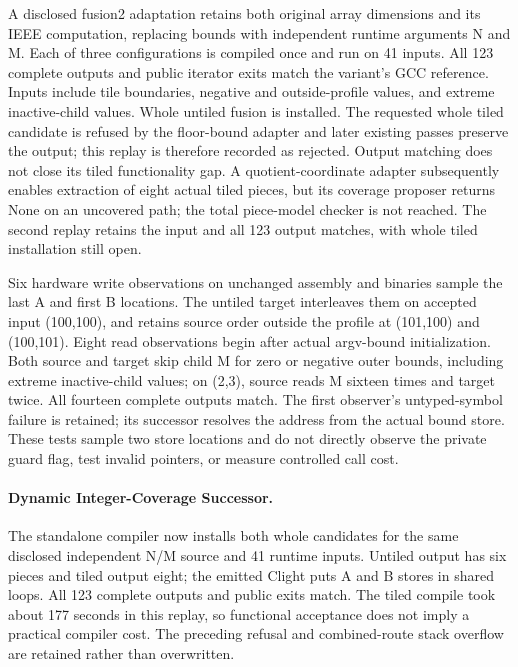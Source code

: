 A disclosed fusion2 adaptation retains both original array dimensions and its
IEEE computation, replacing bounds with independent runtime arguments N and M.
Each of three configurations is compiled once and run on 41 inputs. All 123
complete outputs and public iterator exits match the variant's GCC reference.
Inputs include tile boundaries, negative and outside-profile values, and extreme
inactive-child values. Whole untiled fusion is installed. The requested whole
tiled candidate is refused by the floor-bound adapter and later existing passes
preserve the output; this replay is therefore recorded as rejected. Output
matching does not close its tiled functionality gap. A quotient-coordinate
adapter subsequently enables extraction of eight actual tiled pieces, but its
coverage proposer returns None on an uncovered path; the total piece-model
checker is not reached. The second replay retains the input and all 123 output
matches, with whole tiled installation still open.

Six hardware write observations on unchanged assembly and binaries sample the
last A and first B locations. The untiled target interleaves them on accepted
input (100,100), and retains source order outside the profile at (101,100) and
(100,101). Eight read observations begin after actual argv-bound initialization.
Both source and target skip child M for zero or negative outer bounds, including
extreme inactive-child values; on (2,3), source reads M sixteen times and target
twice. All fourteen complete outputs match. The first observer's untyped-symbol
failure is retained; its successor resolves the address from the actual bound
store. These tests sample two store locations and do not directly observe the
private guard flag, test invalid pointers, or measure controlled call cost.

\paragraph{Dynamic Integer-Coverage Successor.}
The standalone compiler now installs both whole candidates for the same
disclosed independent N/M source and 41 runtime inputs. Untiled output has six
pieces and tiled output eight; the emitted Clight puts A and B stores in shared
loops. All 123 complete outputs and public exits match. The tiled compile took
about 177 seconds in this replay, so functional acceptance does not imply a
practical compiler cost. The preceding refusal and combined-route stack
overflow are retained rather than overwritten.

